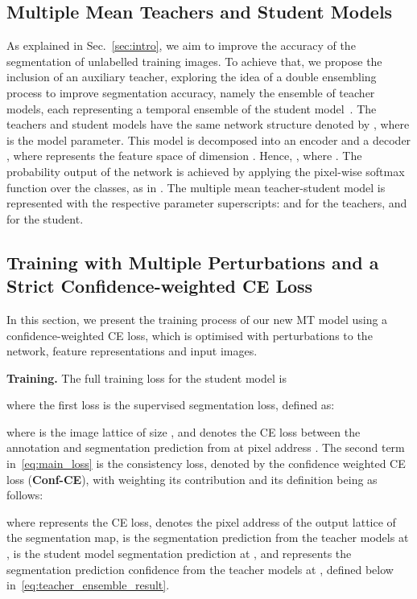 \documentclass[10pt,twocolumn,letterpaper]{article}
\begin{document}
\subsection{Multiple Mean Teachers and Student Models}
\label{sec:multiple_mean_teacher_student_model}


As explained in Sec.~\ref{sec:intro}, we aim to improve the accuracy of the segmentation of unlabelled training images. To achieve that, we propose the inclusion of an auxiliary teacher, exploring the idea of a double ensembling process to improve segmentation accuracy, namely the 
ensemble of teacher models, each representing a temporal ensemble of the student model~\cite{tarvainen2017mean}. 
The teachers and student models have the same network structure denoted by , where  is the model parameter.
This model is decomposed into an encoder  and a decoder , where  represents the feature space of dimension . Hence, , where . The probability output of the network is achieved by applying the pixel-wise softmax function  over the  classes, as in
.
The multiple mean teacher-student model is represented with the respective parameter superscripts:  and  for the teachers, and  for the student.


\subsection{Training with Multiple Perturbations and a Strict Confidence-weighted CE Loss}
\label{sec:consistency_loss}

In this section, we present the training process of our new MT model using a confidence-weighted CE loss, which is optimised with perturbations to 
the network, feature representations and input images.


\textbf{Training.} The full training loss for the student model is

where the first loss is the supervised segmentation loss, defined as:

where  is the image lattice of size , and  denotes the CE loss between the annotation  and
segmentation prediction from  at pixel address . 
The second term in~\eqref{eq:main_loss} is the consistency loss, denoted by the confidence weighted CE loss (\textbf{Conf-CE}), with
 weighting its contribution and its definition being as follows:

where  represents the CE loss,
 denotes the pixel address of the output lattice  of the segmentation map,
 is the segmentation prediction from the teacher models at , 
 is the student model segmentation prediction at , 
and
 represents the segmentation prediction confidence from the teacher models at , defined below in~\eqref{eq:teacher_ensemble_result}. 
\end{document}
